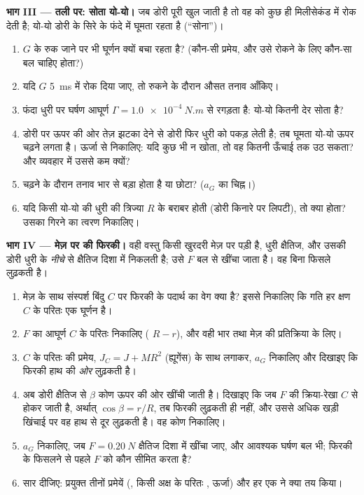 \begin{problem}
\medskip
\noindent\textbf{भाग III --- तली पर: सोता यो-यो।}
जब डोरी पूरी खुल जाती है तो वह  को कुछ ही मिलीसेकंड में
रोक देती है; यो-यो डोरी के सिरे के फंदे में घूमता रहता है (``सोना'')।
\begin{enumerate}[resume]
  \item $G$ के रुक जाने पर भी घूर्णन क्यों बचा रहता है? (कौन-सी प्रमेय,
        और उसे रोकने के लिए कौन-सा बल चाहिए होता?)
  \item यदि $G$ \qty{5}{ms} में रोक दिया जाए, तो रुकने के दौरान औसत तनाव
        आँकिए।
  \item फंदा धुरी पर घर्षण आघूर्ण $\Gamma =
        \qty{1.0e-4}{N.m}$ से रगड़ता है: यो-यो कितनी देर सोता है?
  \item डोरी पर ऊपर की ओर तेज़ झटका देने से डोरी फिर धुरी को पकड़ लेती
        है; तब घूमता यो-यो ऊपर चढ़ने लगता है। ऊर्जा से निकालिए: यदि कुछ
        भी न खोता, तो वह कितनी ऊँचाई तक उठ सकता? और व्यवहार में उससे कम
        क्यों?
  \item चढ़ने के दौरान तनाव भार से बड़ा होता है या छोटा? ($a_G$ का
        चिह्न।)
  \item यदि किसी यो-यो की धुरी की त्रिज्या $R$ के बराबर होती (डोरी किनारे
        पर लिपटी), तो क्या होता? उसका गिरने का त्वरण निकालिए।
\end{enumerate}

\medskip
\noindent\textbf{भाग IV --- मेज़ पर की फिरकी।}
वही वस्तु किसी खुरदरी मेज़ पर पड़ी है, धुरी क्षैतिज, और उसकी डोरी धुरी के
\emph{नीचे} से क्षैतिज दिशा में निकलती है; उसे $F$ बल से खींचा जाता है। वह
बिना फिसले लुढ़कती है।
\begin{enumerate}[resume]
  \item मेज़ के साथ संस्पर्श बिंदु $C$ पर फिरकी के पदार्थ का वेग क्या है?
        इससे निकालिए कि गति हर क्षण $C$ के परितः एक घूर्णन है।
  \item $F$ का आघूर्ण $C$ के परितः निकालिए ( $R - r$), और वही
        भार तथा मेज़ की प्रतिक्रिया के लिए।
  \item $C$ के परितः  की प्रमेय, $J_C = J +
        MR^2$ (ह्यूगेंस) के साथ लगाकर, $a_G$ निकालिए और दिखाइए कि फिरकी
        हाथ की \emph{ओर} लुढ़कती है।
  \item अब डोरी क्षैतिज से $\beta$ कोण ऊपर की ओर खींची जाती है। दिखाइए कि
        जब $F$ की क्रिया-रेखा $C$ से होकर जाती है, अर्थात्
        $\cos\beta = r/R$, तब फिरकी लुढ़कती ही नहीं, और उससे अधिक खड़ी
        खिंचाई पर वह हाथ से दूर लुढ़कती है। वह कोण निकालिए।
  \item $a_G$ निकालिए, जब $F = \qty{0.20}{N}$ क्षैतिज दिशा में खींचा जाए,
        और आवश्यक घर्षण बल भी; फिरकी के फिसलने से पहले $F$ को कौन सीमित
        करता है?
  \item सार दीजिए: प्रयुक्त तीनों प्रमेयें (, किसी अक्ष
        के परितः , ऊर्जा) और हर एक ने क्या तय किया।
\end{enumerate}
\end{problem}
